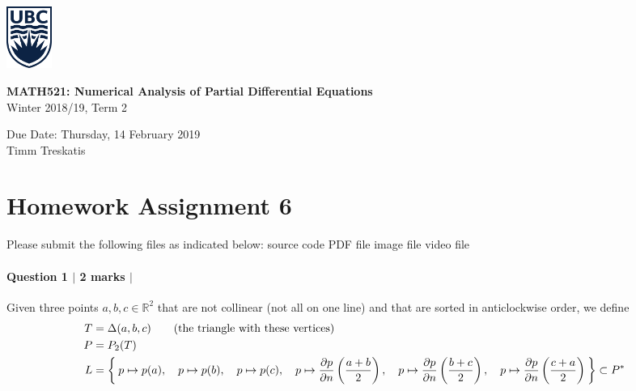 \documentclass[10pt,letterpaper]{scrartcl}
\begin{document}
\begin{minipage}{.2\textwidth}
\includegraphics[width=42pt]{ubc-logo.png}
\end{minipage}
\hfill
\begin{minipage}{.75\textwidth}
\setlength{\parskip}{6pt}
\begin{flushright}
{
\sffamily
\textbf{MATH521: Numerical Analysis of Partial Differential Equations}\\
Winter 2018/19, Term 2

Due Date: Thursday, 14 February 2019\\
Timm Treskatis
}
\end{flushright}
\end{minipage}

\section*{Homework Assignment 6}

Please submit the following files as indicated below: \hfill \faFileCodeO \: source code \hfill \faFilePdfO \: PDF file \hfill \faFilePictureO \: image file \hfill \faFileMovieO \: video file

\paragraph*{Question 1 $\vert$ 2 marks $\vert$ \faFilePdfO}

Given three points $a,b,c \in \mathds{R}^2$ that are not collinear (not all on one line) and that are sorted in anticlockwise order, we define
\begin{align*}
T &= \Delta(a,b,c) \qquad \text{(the triangle with these vertices)}\\
P &= P_2(T)\\
L &= \Set{ p\mapsto p(a), \quad
 p\mapsto p(b),\quad
 p\mapsto p(c),\quad
 p\mapsto \frac{\partial p}{\partial n}\left(\frac{a+b}{2}\right),\quad
 p\mapsto \frac{\partial p}{\partial n}\left(\frac{b+c}{2}\right),\quad
 p\mapsto \frac{\partial p}{\partial n}\left(\frac{c+a}{2}\right)} \subset P^*
\end{align*}

\begin{center}
\end{center}
\end{document}
